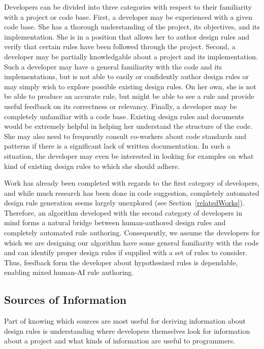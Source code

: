 \documentclass[12pt]{article}
\begin{document}
Developers can be divided into three categories with respect to their familiarity with a project or code base. First, a developer may be experienced with a given code base. She has a thorough understanding of the project, its objectives, and its implementation. She is in a position that allows her to author design rules and verify that certain rules have been followed through the project. Second, a developer may be partially knowledgable about a project and its implementation. Such a developer may have a general familiarity with the code and its implementations, but is not able to easily or confidently author design rules or may simply wish to explore possible existing design rules. On her own, she is not be able to produce an accurate rule, but might be able to see a rule and provide useful feedback on its correctness or relevancy. Finally, a developer may be completely unfamiliar with a code base. Existing design rules and documents would be extremely helpful in helping her understand the structure of the code. She may also need to frequently consult co-workers about code standards and patterns if there is a significant lack of written documentation. In such a situation, the developer may even be interested in looking for examples on what kind of existing design rules to which she should adhere.

Work has already been completed with regards to the first category of developers, and while much research has been done in code suggestion, completely automated design rule generation seems largely unexplored (see Section~\ref{relatedWorks}). Therefore, an algorithm developed with the second category of developers in mind forms a natural bridge between human-authored design rules and completely automated rule authoring. Consequently, we assume the developers for which we are designing our algorithm have some general familiarity with the code and can identify proper design rules if supplied with a set of rules to consider. Thus, feedback form the developer about hypothesized rules is dependable, enabling mixed human-AI rule authoring.

\subsection{Sources of Information} \label{infoSrcs}

Part of knowing which sources are most useful for deriving information about design rules is understanding where developers themselves look for information about a project and what kinds of information are useful to programmers.  
\end{document}
